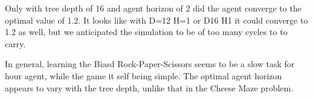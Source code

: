 \documentclass{article}
\begin{document}
\begin{flushleft}
Only with tree depth of 16 and agent horizon of 2 did the 
agent converge to the optimal value of 1.2.
It looks like with D=12 H=1 or D16 H1 it could converge
to 1.2 as well, but we anticipated the simulation to be
of too many cycles to to carry.

In general, learning the Biasd Rock-Paper-Scissors seems
to be a slow task for hour agent, while the game it self being simple. 
The optimal agent horizon appears to vary with the tree depth, 
unlike that in the Cheese Maze problem.

\begin{figure}
\vspace{-30em}

\end{figure}

\def\rpscurves*{
\one{sp7-rps.csv}   \addlegendentry{D=16 H=2}
\one{spA-rps.csv}   \addlegendentry{D=12 H=1}
\one{spE-rps.csv}   \addlegendentry{D=10 H=1}
\one{spD-rps.csv}   \addlegendentry{D=10 H=2}
\one{sp1-rps.csv}   \addlegendentry{D=12 H=2}
\one{sp1-p-rps.csv} \addlegendentry{D=12 H=2 R}
\one{sp3-rps.csv}   \addlegendentry{D=6 H=2}
\one{sp2-p-rps.csv} \addlegendentry{D=4 H=2 R}
\one{sp4-rps.csv}   \addlegendentry{D=4 H=4}
\one{sp2-rps.csv}   \addlegendentry{D=4 H=2}
\one{sp9-rps.csv}   \addlegendentry{D=12 H=2}
\one{sp6-rps.csv}   \addlegendentry{D=32 H=2}
\one{sp8-rps.csv}   \addlegendentry{D=16 H=1}
\one{spC-rps.csv}   \addlegendentry{D=8 H=1}
\one{spB-rps.csv}   \addlegendentry{D=8 H=2}
}
\begin{figure}


\end{figure}
\end{flushleft}
\end{document}
